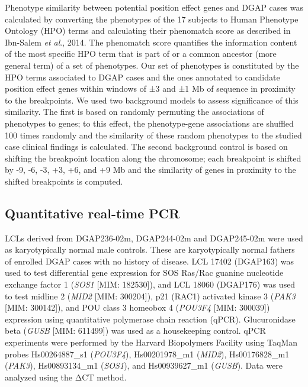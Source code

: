 \documentclass[a4paper,twoside=true,openright,parskip=full,chapterprefix=true,11pt,headings=normal,bibliography=totoc,listof=totoc,titlepage=on,captions=tableabove,draft=false]{scrreprt}
\theoremstyle{definition}
\theoremstyle{definition}
\theoremstyle{definition}
\theoremstyle{remark}
\begin{document}
Phenotype similarity between potential position effect genes and DGAP
cases was calculated by converting the phenotypes of the 17 subjects to
Human Phenotype Ontology (HPO)\citep{Kohler2014} terms and calculating
their phenomatch score as described in Ibn-Salem \emph{et al}.,
2014.\citep{Ibn-Salem2014} The phenomatch score quantiﬁes the
information content of the most speciﬁc HPO term that is part of or a
common ancestor (more general term) of a set of phenotypes. Our set of
phenotypes is constituted by the HPO terms associated to DGAP cases and
the ones annotated to candidate position effect genes within windows of
±3 and ±1 Mb of sequence in proximity to the breakpoints. We used two
background models to assess signiﬁcance of this similarity. The ﬁrst is
based on randomly permuting the associations of phenotypes to genes; to
this effect, the phenotype-gene associations are shuffled 100 times
randomly and the similarity of these random phenotypes to the studied
case clinical findings is calculated. The second background control is
based on shifting the breakpoint location along the chromosome; each
breakpoint is shifted by -9, -6, -3, +3, +6, and +9 Mb and the
similarity of genes in proximity to the shifted breakpoints is computed.

\hypertarget{quantitative-real-time-pcr}{%
\subsection{Quantitative real-time
PCR}\label{quantitative-real-time-pcr}}

LCLs derived from DGAP236-02m, DGAP244-02m and DGAP245-02m were used as
karyotypically normal male controls. These are karyotypically normal
fathers of enrolled DGAP cases with no history of disease. LCL 17402
(DGAP163) was used to test differential gene expression for SOS Ras/Rac
guanine nucleotide exchange factor 1 (\emph{SOS1} {[}MIM: 182530{]}),
and LCL 18060 (DGAP176) was used to test midline 2 (\emph{MID2} {[}MIM:
300204{]}), p21 (RAC1) activated kinase 3 (\emph{PAK3} {[}MIM:
300142{]}), and POU class 3 homeobox 4 (\emph{POU3F4} {[}MIM: 300039{]})
expression using quantitative polymerase chain reaction (qPCR).
Glucuronidase beta (\emph{GUSB} {[}MIM: 611499{]}) was used as a
housekeeping control. qPCR experiments were performed by the Harvard
Biopolymers Facility using TaqMan probes Hs00264887\_s1 (\emph{POU3F4}),
Hs00201978\_m1 (\emph{MID2}), Hs00176828\_m1 (\emph{PAK3}),
Hs00893134\_m1 (\emph{SOS1}), and Hs00939627\_m1 (\emph{GUSB}). Data
were analyzed using the ΔCT method.
\end{document}

